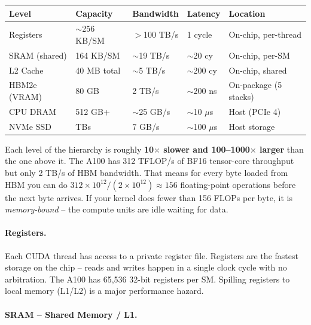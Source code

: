 \begin{keybox}
\small
\begin{tabular}{@{}lllll@{}}
\toprule
\textbf{Level} & \textbf{Capacity} & \textbf{Bandwidth} & \textbf{Latency} & \textbf{Location} \\
\midrule
Registers & $\sim$256 KB/SM & $>$100 TB/s & 1 cycle & On-chip, per-thread \\
SRAM (shared) & 164 KB/SM & $\sim$19 TB/s & $\sim$20 cy & On-chip, per-SM \\
L2 Cache & 40 MB total & $\sim$5 TB/s & $\sim$200 cy & On-chip, shared \\
HBM2e (VRAM) & 80 GB & 2 TB/s & $\sim$200 ns & On-package (5 stacks) \\
CPU DRAM & 512 GB+ & $\sim$25 GB/s & $\sim$10 $\mu$s & Host (PCIe 4) \\
NVMe SSD & TBs & 7 GB/s & $\sim$100 $\mu$s & Host storage \\
\bottomrule
\end{tabular}
\end{keybox}

\begin{intuitionbox}
Each level of the hierarchy is roughly \textbf{10$\times$ slower and 100--1000$\times$ larger} than the one above it. The A100 has 312 TFLOP/s of BF16 tensor-core throughput but only 2 TB/s of HBM bandwidth. That means for every byte loaded from HBM you can do $312 \times 10^{12} / (2 \times 10^{12}) \approx 156$ floating-point operations before the next byte arrives. If your kernel does fewer than 156 FLOPs per byte, it is \emph{memory-bound} -- the compute units are idle waiting for data.
\end{intuitionbox}

\paragraph{Registers.}
\label{registers.}

Each CUDA thread has access to a private register file. Registers are the fastest storage on the chip -- reads and writes happen in a single clock cycle with no arbitration. The A100 has 65,536 32-bit registers per SM. Spilling registers to local memory (L1/L2) is a major performance hazard.

\paragraph{SRAM -- Shared Memory / L1.}
\label{sram-shared-memory-l1.}

